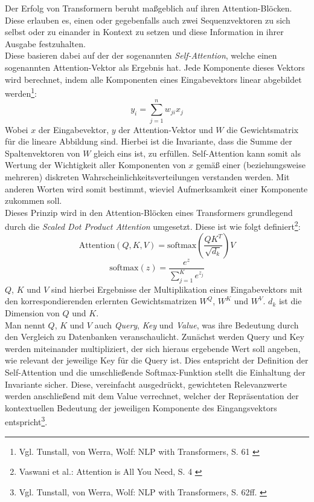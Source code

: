 Der Erfolg von Transformern beruht maßgeblich auf ihren Attention-Blöcken. Diese erlauben es, einen oder gegebenfalls auch zwei Sequenzvektoren zu sich selbst oder zu einander in Kontext zu setzen und diese Information in ihrer Ausgabe festzuhalten. \\
Diese basieren dabei auf der der sogenannten \textit{Self-Attention}, welche einen sogenannten Attention-Vektor als Ergebnis hat. Jede Komponente dieses Vektors wird berechnet, indem alle Komponenten eines Eingabevektors linear abgebildet werden\footnote{
    Vgl. Tunstall, von Werra, Wolf: NLP with Transformers, S. 61
    \cite{tunstall2022natural}
}:
\begin{equation}
    y_i = \sum_{j=1}^n w_{ji}x_j
\end{equation}
Wobei $x$ der Eingabevektor, $y$ der Attention-Vektor und $W$ die Gewichtsmatrix für die lineare Abbildung sind. Hierbei ist die Invariante, dass die Summe der Spaltenvektoren von $W$ gleich eins ist, zu erfüllen. Self-Attention kann somit als Wertung der Wichtigkeit aller Komponenten von $x$ gemäß einer (beziehungsweise mehreren) diskreten Wahrscheinlichkeitsverteilungen verstanden werden. Mit anderen Worten wird somit bestimmt, wieviel Aufmerksamkeit einer Komponente zukommen soll. \\
Dieses Prinzip wird in den Attention-Blöcken eines Transformers grundlegend durch die \textit{Scaled Dot Product Attention} umgesetzt. Diese ist wie folgt definiert\footnote{
    Vaswani et al.: Attention is All You Need, S. 4
    \cite{vaswani2023attentionneed}
}:
\begin{equation}
    \text{Attention}(Q, K, V) = \text{softmax}
    \left (
        \frac {QK^T} {\sqrt{d_k}}
    \right ) V
\end{equation}
\begin{equation}
    \text{softmax}(z) = \frac{e^z}{\sum_{j=1}^K e^{z_j}}
\end{equation}
$Q$, $K$ und $V$ sind hierbei Ergebnisse der Multiplikation eines Eingabevektors mit den korrespondierenden erlernten Gewichtsmatrizen $W^Q$, $W^K$ und $W^V$. $d_k$ ist die Dimension von $Q$ und $K$. \\
Man nennt $Q$, $K$ und $V$ auch \textit{Query}, \textit{Key} und \textit{Value}, was ihre Bedeutung durch den Vergleich zu Datenbanken veranschaulicht. Zunächst werden Query und Key werden miteinander multipliziert, der sich hieraus ergebende Wert soll angeben, wie relevant der jeweilige Key für die Query ist. Dies entspricht der Definition der Self-Attention und die umschließende Softmax-Funktion stellt die Einhaltung der Invariante sicher. Diese, vereinfacht ausgedrückt, gewichteten Relevanzwerte werden anschließend mit dem Value verrechnet, welcher der Repräsentation der kontextuellen Bedeutung der jeweiligen Komponente des Eingangsvektors entspricht\footnote{
    Vgl. Tunstall, von Werra, Wolf: NLP with Transformers, S. 62ff.
    \cite{tunstall2022natural}
}. \\

